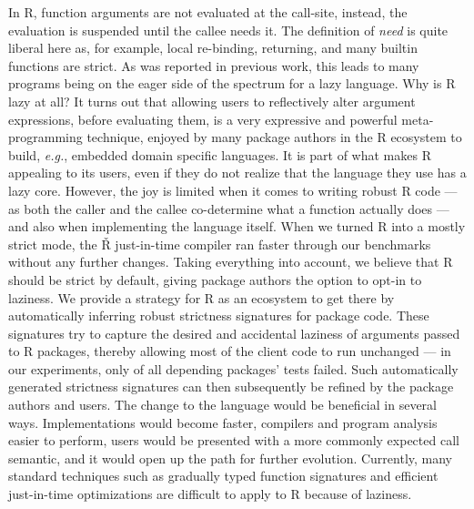 \documentclass[review,nonacm,screen,acmsmall,anonymous=true]{acmart}
\renewcommand{\Rsh}{{\sf\v R}\xspace}
\newcommand{\eg}{\emph{e.g.},\xspace}
\begin{document}
In R, function arguments are not evaluated at the call-site, instead, the
evaluation is suspended until the callee needs it. The definition of
\emph{need} is quite liberal here as, for example, local re-binding, returning,
and many builtin functions are strict. As was reported in previous work, this
leads to many programs being on the eager side of the spectrum for a lazy
language. Why is R lazy at all? It turns out that allowing users to reflectively
alter argument expressions, before evaluating them, is a very expressive and
powerful meta-programming technique, enjoyed by many package authors in the R
ecosystem to build, \eg embedded domain specific languages. It is part of
what makes R appealing to its users, even if they do not realize that the
language they use has a lazy core. However, the joy is limited when it comes to
writing robust R code --- as both the caller and the callee co-determine what a function
actually does --- and also when implementing the language itself. When we turned
R into a mostly strict mode, the \Rsh just-in-time compiler ran
\speedupRshStrict faster through our benchmarks without any further changes.
Taking everything into account, we believe that R should be strict by default,
giving package authors the option to opt-in to laziness. We provide a strategy
for R as an ecosystem to get there by automatically inferring robust strictness
signatures for package code. These signatures try to capture the desired and
accidental laziness of arguments passed to R packages, thereby allowing most of
the client code to run unchanged --- in our experiments, only \robustnesResult of
all depending packages' tests failed. Such automatically generated strictness
signatures can then subsequently be refined by the package authors and users.
The change to the language would be beneficial in several ways. Implementations
would become faster, compilers and program analysis easier to perform, users
would be presented with a more commonly expected call semantic, and it would open
up the path for further evolution. Currently, many standard techniques such as
gradually typed function signatures and efficient just-in-time optimizations are
difficult to apply to R because of laziness.




\appendix
\end{document}

